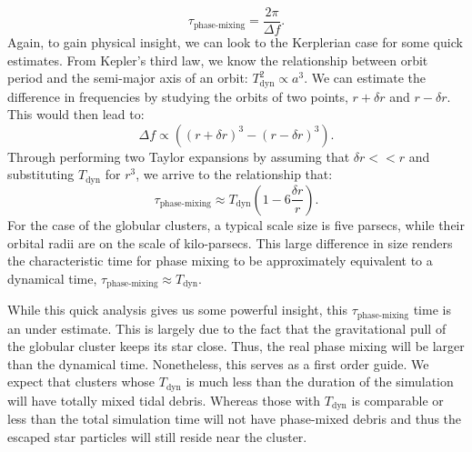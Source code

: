 \begin{equation}
    \tau_{\textrm{phase-mixing}} = \frac{2\pi}{\Delta f}.
\end{equation}
Again, to gain physical insight, we can look to the Kerplerian case for some quick estimates. From Kepler's third law, we know the relationship between orbit period and the semi-major axis of an orbit: $T_{\textrm{dyn}}^2\propto a^3$. We can estimate the difference in frequencies by studying the orbits of two points, $r+\delta r$ and $r-\delta r$. This would then lead to:
\begin{equation}
    \Delta f \propto \left(\left(r+\delta r\right)^3 - \left(r-\delta r\right)^3\right).
\end{equation}
Through performing two Taylor expansions by assuming that $\delta r << r$ and substituting $T_{\mathrm{dyn}}$ for $r^3$, we arrive to the relationship that:
\begin{equation}
    \tau_{\textrm{phase-mixing}} \approx T_{\mathrm{dyn}}\left(1-6\frac{\delta r}{r}\right).
\end{equation}
For the case of the globular clusters, a typical scale size is five parsecs, while their orbital radii are on the scale of kilo-parsecs. This large difference in size renders the characteristic time for phase mixing to be approximately equivalent to a dynamical time, $\tau_{\textrm{phase-mixing}} \approx T_{\mathrm{dyn}}$. 

While this quick analysis gives us some powerful insight, this $\tau_{\textrm{phase-mixing}}$ time is an under estimate. This is largely due to the fact that the gravitational pull of the globular cluster keeps its star close. Thus, the real phase mixing will be larger than the dynamical time. Nonetheless, this serves as a first order guide. We expect that clusters whose $T_{\mathrm{dyn}}$ is much less than the duration of the simulation will have totally mixed tidal debris. Whereas those with $T_{\mathrm{dyn}}$ is comparable or less than the total simulation time will not have phase-mixed debris and thus the escaped star particles will still reside near the cluster.

